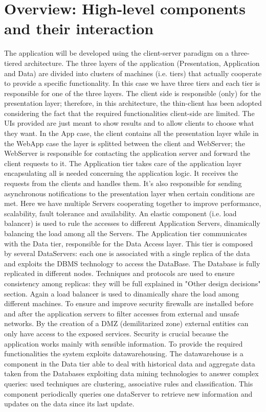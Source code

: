 \documentclass[a4paper]{report}
\begin{document}
\section{Overview: High­‐level components and their	interaction}
The application will be developed using the client-server paradigm on a three-tiered architecture. The three layers of the application (Presentation, Application and Data) are divided into clusters of machines (i.e. tiers) that actually cooperate to provide a specific functionality. In this case we have three tiers  and each tier is responsible for one of the three layers. The client side is responsible (only) for the presentation layer; therefore, in this architecture, the thin-client has been adopted considering the fact that the required functionalities client-side are limited. The UIs provided are just meant to show results and to allow clients to choose what they want.  In the App case, the client contains all the presentation layer while in the WebApp case the layer is splitted between the client and WebServer; the WebServer is responsible for contacting the application server and forward the client requests to it. The Application tier takes care of the application layer encapsulating all is needed concerning the application logic. It receives the requests from the clients and handles them. It's also responsible for sending asynchronous notifications to the presentation layer when certain conditions are met.  Here we have multiple Servers cooperating together to improve performance, scalability, fault tolerance and availability. An elastic component (i.e. load balancer) is used to rule the accesses to different Application Servers, dinamically balancing the load among all the Servers. The Application tier communicates with the Data tier, responsible for the Data Access layer. This tier is composed by several DataServers: each one is associated with a single replica of the data and exploits the DBMS technology to access the DataBase. The Database is fully replicated in different nodes. Techniques and protocols are used to ensure consistency among replicas: they will be full explained in "Other design decisions" section. Again a load balancer is used to dinamically share the load among different machines. 
To ensure and improve security firewalls are installed before and after the application servers to filter accesses from external and unsafe networks. By the creation of a DMZ (demilitarized zone) external entities can only have access to the exposed services. Security is crucial because the application works mainly with sensible information.
To provide the required functionalities the system exploits datawarehousing. The datawarehouse is a component in the Data tier able to deal with historical data and aggregate data taken from the Databases exploiting data mining technologies to answer complex queries: used techniques are clustering, associative rules and classification. This component periodically queries one dataServer to retrieve new information and updates on the data since its last update. 
\end{document}
